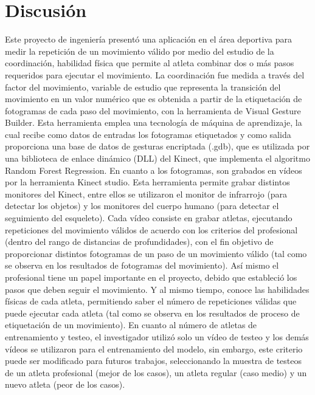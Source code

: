 \chapter{Discusi\'on}
Este proyecto de ingenier\'ia present\'o una aplicaci\'on en el \'area deportiva para medir la repetici\'on de un movimiento v\'alido por medio del estudio de la coordinaci\'on, habilidad f\'isica que permite al atleta combinar dos o m\'as pasos requeridos para ejecutar el movimiento. 
\medbreak
La coordinaci\'on fue medida a trav\'es del factor del movimiento, variable de estudio que representa la transici\'on del movimiento en un valor num\'erico que es obtenida a partir de la etiquetaci\'on de fotogramas de cada paso del movimiento, con la herramienta de Visual Gesture Builder.
\medbreak
Esta herramienta emplea una tecnolog\'ia de m\'aquina de aprendizaje, la cual recibe como datos de entradas los fotogramas etiquetados y como salida proporciona una base de datos de gesturas encriptada (.gdb), que es utilizada por una biblioteca de enlace din\'amico (DLL) del Kinect, que implementa el algoritmo Random Forest Regression.
\medbreak
En cuanto a los fotogramas, son grabados en v\'ideos por la herramienta Kinect studio. Esta herramienta permite grabar distintos monitores del Kinect, entre ellos se utilizaron el monitor de infrarrojo (para detectar los objetos) y los monitores del cuerpo humano (para detectar el seguimiento del esqueleto).
\medbreak
Cada v\'ideo consiste en grabar atletas, ejecutando repeticiones del movimiento v\'alidos de acuerdo con los criterios del profesional (dentro del rango de distancias de profundidades), con el fin objetivo de proporcionar distintos fotogramas de un paso de un movimiento v\'alido (tal como se observa en los resultados de fotogramas del movimiento).
\medbreak
As\'i mismo el profesional tiene un papel importante en el proyecto, debido que estableci\'o los pasos que deben seguir el movimiento. Y al mismo tiempo, conoce las habilidades f\'isicas de cada atleta, permitiendo saber el n\'umero de repeticiones v\'alidas que puede ejecutar cada atleta (tal como se observa en los resultados de proceso de etiquetaci\'on de un movimiento).
\medbreak
En cuanto al n\'umero de atletas de entrenamiento y testeo, el investigador utiliz\'o solo un v\'ideo de testeo y los dem\'as v\'ideos se utilizaron para el entrenamiento del modelo, sin embargo, este criterio puede ser modificado para futuros trabajos, seleccionando la muestra de testeos de un atleta profesional (mejor de los casos), un atleta regular (caso medio) y un nuevo atleta (peor de los casos).
